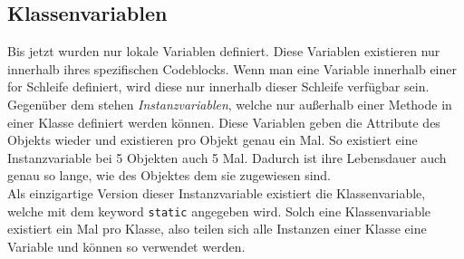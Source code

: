 \documentclass{article}
\begin{document}
	\subsection{Klassenvariablen}
	Bis jetzt wurden nur lokale Variablen definiert. Diese Variablen existieren nur innerhalb ihres spezifischen Codeblocks. Wenn man eine Variable innerhalb einer for Schleife definiert, wird diese nur innerhalb dieser Schleife verfügbar sein. \\
	Gegenüber dem stehen \textit{Instanzvariablen}, welche nur außerhalb einer Methode in einer Klasse definiert werden können. Diese Variablen geben die Attribute des Objekts wieder und existieren pro Objekt genau ein Mal. So existiert eine Instanzvariable bei 5 Objekten auch 5 Mal. Dadurch ist ihre Lebensdauer auch genau so lange, wie des Objektes dem sie zugewiesen sind. \\
	Als einzigartige Version dieser Instanzvariable existiert die Klassenvariable, welche mit dem keyword \verb|static| angegeben wird. Solch eine Klassenvariable existiert ein Mal pro Klasse, also teilen sich alle Instanzen einer Klasse eine Variable und können so verwendet werden. \\
\end{document}
